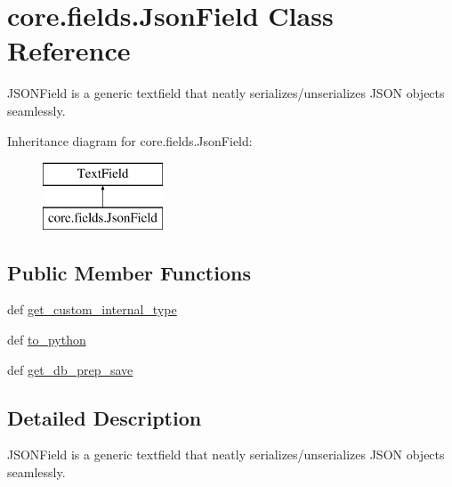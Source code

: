 \hypertarget{classcore_1_1fields_1_1JsonField}{\section{core.\-fields.\-Json\-Field Class Reference}
\label{classcore_1_1fields_1_1JsonField}
}


J\-S\-O\-N\-Field is a generic textfield that neatly serializes/unserializes J\-S\-O\-N objects seamlessly.  


Inheritance diagram for core.\-fields.\-Json\-Field\-:\begin{figure}[H]
\begin{center}
\leavevmode
\includegraphics[height=2.000000cm]{classcore_1_1fields_1_1JsonField}
\end{center}
\end{figure}
\subsection*{Public Member Functions}
\begin{DoxyCompactItemize}
\item 
def \hyperlink{classcore_1_1fields_1_1JsonField_abac7ef742861c6a1bb4d7b738617a239}{get\-\_\-custom\-\_\-internal\-\_\-type}
\item 
def \hyperlink{classcore_1_1fields_1_1JsonField_a7b9074a7adf9567b61f27c498f6252e3}{to\-\_\-python}
\item 
def \hyperlink{classcore_1_1fields_1_1JsonField_a67375a04019233035864ce6935498d0b}{get\-\_\-db\-\_\-prep\-\_\-save}
\end{DoxyCompactItemize}


\subsection{Detailed Description}
J\-S\-O\-N\-Field is a generic textfield that neatly serializes/unserializes J\-S\-O\-N objects seamlessly. 

